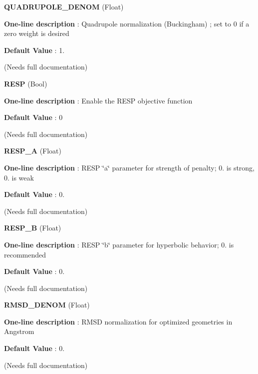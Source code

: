 \begin{DoxyItemize}
\item {\bfseries  \-Q\-U\-A\-D\-R\-U\-P\-O\-L\-E\-\_\-\-D\-E\-N\-O\-M } (\-Float) \par
{\bfseries  \-One-\/line description }\-: \-Quadrupole normalization (\-Buckingham) ; set to 0 if a zero weight is desired \par
{\bfseries  \-Default \-Value }\-: 1. \par
(\-Needs full documentation)\end{DoxyItemize}
\begin{DoxyItemize}
\item {\bfseries  \-R\-E\-S\-P } (\-Bool) \par
{\bfseries  \-One-\/line description }\-: \-Enable the \-R\-E\-S\-P objective function \par
{\bfseries  \-Default \-Value }\-: 0 \par
(\-Needs full documentation)\end{DoxyItemize}
\begin{DoxyItemize}
\item {\bfseries  \-R\-E\-S\-P\-\_\-\-A } (\-Float) \par
{\bfseries  \-One-\/line description }\-: \-R\-E\-S\-P \char`\"{}a\char`\"{} parameter for strength of penalty; 0. is strong, 0. is weak \par
{\bfseries  \-Default \-Value }\-: 0. \par
(\-Needs full documentation)\end{DoxyItemize}
\begin{DoxyItemize}
\item {\bfseries  \-R\-E\-S\-P\-\_\-\-B } (\-Float) \par
{\bfseries  \-One-\/line description }\-: \-R\-E\-S\-P \char`\"{}b\char`\"{} parameter for hyperbolic behavior; 0. is recommended \par
{\bfseries  \-Default \-Value }\-: 0. \par
(\-Needs full documentation)\end{DoxyItemize}
\begin{DoxyItemize}
\item {\bfseries  \-R\-M\-S\-D\-\_\-\-D\-E\-N\-O\-M } (\-Float) \par
{\bfseries  \-One-\/line description }\-: \-R\-M\-S\-D normalization for optimized geometries in \-Angstrom \par
{\bfseries  \-Default \-Value }\-: 0. \par
(\-Needs full documentation)\end{DoxyItemize}
